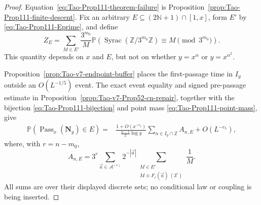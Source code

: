 \begin{proof}
Equation~\eqref{eq:Tao-Prop111-theorem-failure} is
Proposition~\ref{prop:Tao-Prop111-finite-descent}.  Fix an arbitrary
\(E\subseteq(2\mathbb N+1)\cap[1,x]\), form \(E'\) by
\eqref{eq:Tao-Prop111-Eprime}, and define
\begin{equation}
\label{eq:Tao-Prop111-ZE}
 Z_E=\sum_{M\in E'}\frac{3^{m_0}}M
 \mathbb P\!\left(
  \operatorname{Syrac}(\mathbb Z/3^{m_0}\mathbb Z)
  \equiv M\pmod{3^{m_0}}
 \right).
\end{equation}
This quantity depends on \(x\) and \(E\), but not on whether
\(y=x^\alpha\) or \(y=x^{\alpha^2}\).

Proposition~\ref{prop:Tao-v7-endpoint-buffer} places the first-passage time
in \(I_y\) outside an \(O(L^{-1/5})\) event.  The exact event equality and
signed pre-passage estimate in
Proposition~\ref{prop:Tao-v7-Prop52-cn-repair}, together with the bijection
\eqref{eq:Tao-Prop111-bijection} and point mass
\eqref{eq:Tao-Prop111-point-mass}, give
\begin{equation}
\label{eq:Tao-Prop111-pre-mixing}
\begin{split}
 \mathbb P(\operatorname{Pass}_x(\mathbf N_y)\in E)
 ={}&\frac{1+O(x^{-c_4})}
          {\frac{\alpha-1}{2}\log y}
 \sum_{n\in I_y\cap\mathbb Z} A_{n,E}
 +O(L^{-c_5}),
\end{split}
\end{equation}
where, with \(r=n-m_0\),
\[
 A_{n,E}=3^r
 \sum_{\vec a\in\mathcal A^{(r)}}2^{-|\vec a|}
 \sum_{\substack{M\in E'\\M\equiv F_r(\vec a)\ (3^r)}}\frac1M.
\]
All sums are over their displayed discrete sets; no conditional law or
coupling is being inserted.


\end{proof}
